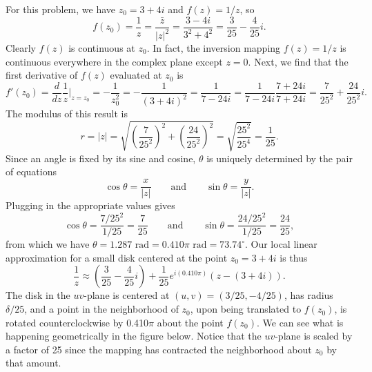 \documentclass[11pt]{article}
\begin{document}
\begin{enumerate}
\begin{mdframed}
  For this problem, we have $z_0 = 3 + 4i$ and $f(z) = 1/z$, so
  \begin{equation*}
   f(z_0) = \frac{1}{z} = \frac{\bar{z}}{|z|^2} = \frac{3 - 4i}{3^2 + 4^2} = \frac{3}{25} - \frac{4}{25}i.
  \end{equation*}
  Clearly $f(z)$ is continuous at $z_0$. In fact, the inversion mapping $f(z) = 1/z$ is continuous everywhere in the complex plane except $z = 0$. Next, we find that the first derivative of $f(z)$ evaluated at $z_0$ is
  \begin{equation*}
  f'(z_0) = \frac{d}{dz}\frac{1}{z}\bigg|_{z = z_0} = -\frac{1}{z_0^2} = -\frac{1}{(3 + 4i)^2} = \frac{1}{7 - 24i} = \frac{1}{7 - 24i}\frac{7 + 24i}{7 + 24i} =  \frac{7}{25^2} + \frac{24}{25^2}i.
  \end{equation*}
  The modulus of this result is
  \begin{equation*}
    r = |z| = \sqrt{\left(\frac{7}{25^2}\right)^2 + \left(\frac{24}{25^2}\right)^2} = \sqrt{\frac{25^2}{25^4}} = \frac{1}{25}.
  \end{equation*}
  Since an angle is fixed by its sine and cosine, $\theta$ is uniquely determined by the pair of equations
  \begin{equation*}
    \cos\theta = \frac{x}{|z|} \qquad\text{and}\qquad \sin\theta = \frac{y}{|z|}.
  \end{equation*}
  Plugging in the appropriate values gives
  \begin{equation*}
    \cos\theta = \frac{7/25^2}{1/25} = \frac{7}{25} \qquad\text{and}\qquad \sin\theta = \frac{24/25^2}{1/25} = \frac{24}{25},
  \end{equation*}
  from which we have $\theta = 1.287 \text{ rad} = 0.410 \pi \text{ rad} = 73.74^\circ$. Our local linear approximation for a small disk centered at the point $z_0 = 3 + 4i$ is thus
  \begin{equation*}
    \frac{1}{z} \approx \left(\frac{3}{25} - \frac{4}{25}i\right) + \frac{1}{25}e^{i(0.410 \pi)}(z - (3 + 4i)).
  \end{equation*}
  The disk in the $uv$-plane is centered at $(u,v) = (3/25,-4/25)$, has radius $\delta/25$, and a point in the neighborhood of $z_0$, upon being translated to $f(z_0)$, is rotated counterclockwise by 0.410$\pi$ about the point $f(z_0)$. We can see what is happening geometrically in the figure below. Notice that the $uv$-plane is scaled by a factor of 25 since the mapping has contracted the neighborhood about $z_0$ by that amount.


\end{mdframed}
\end{enumerate}
\end{document}
